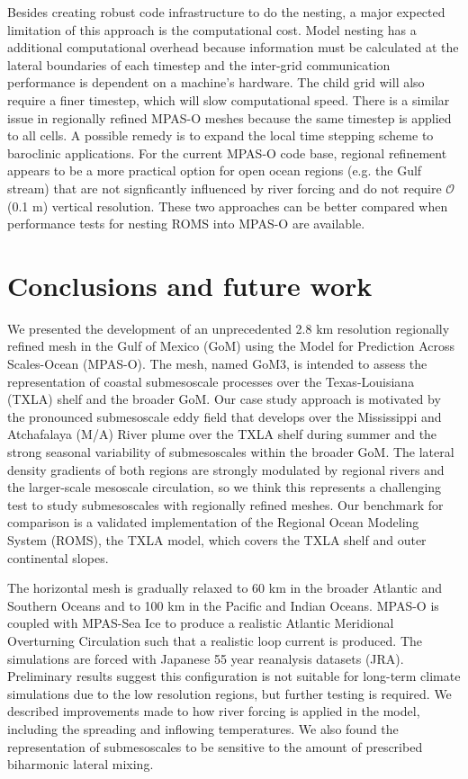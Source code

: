 Besides creating robust code infrastructure to do the nesting, a major expected limitation of this approach is the computational cost. Model nesting has a additional computational overhead because information must be calculated at the lateral boundaries of each timestep and the inter-grid communication performance is dependent on a machine's hardware. The child grid will also require a finer timestep, which will slow computational speed. There is a similar issue in regionally refined MPAS-O meshes because the same timestep is applied to all cells. A possible remedy is to expand the local time stepping scheme \citep{lilly2023storm} to baroclinic applications. For the current MPAS-O code base, regional refinement appears to be a more practical option for open ocean regions (e.g. the Gulf stream) that are not signficantly influenced by river forcing and do not require $\mathcal{O}$(0.1 m) vertical resolution. These two approaches can be better compared when performance tests for nesting ROMS into MPAS-O are available. 

\section{Conclusions and future work}
We presented the development of an unprecedented 2.8 km resolution regionally refined mesh in the Gulf of Mexico (GoM) using the Model for Prediction Across Scales-Ocean (MPAS-O). The mesh, named GoM3, is intended to assess the representation of coastal submesoscale processes over the Texas-Louisiana (TXLA) shelf and the broader GoM. Our case study approach is motivated by the pronounced submesoscale eddy field that develops over the Mississippi and Atchafalaya (M/A) River plume over the TXLA shelf during summer and the strong seasonal variability of submesoscales within the broader GoM. The lateral density gradients of both regions are strongly modulated by regional rivers and the larger-scale mesoscale circulation, so we think this represents a challenging test to study submesoscales with regionally refined meshes. Our benchmark for comparison is a validated implementation of the Regional Ocean Modeling System (ROMS), the TXLA model, which covers the TXLA shelf and outer continental slopes. 

The horizontal mesh is gradually relaxed to 60 km in the broader Atlantic and Southern Oceans and to 100 km in the Pacific and Indian Oceans. MPAS-O is coupled with MPAS-Sea Ice to produce a realistic Atlantic Meridional Overturning Circulation such that a realistic loop current is produced. The simulations are forced with Japanese 55 year reanalysis datasets (JRA). Preliminary results suggest this configuration is not suitable for long-term climate simulations due to the low resolution regions, but further testing is required. We described improvements made to how river forcing is applied in the model, including the spreading and inflowing temperatures. We also found the representation of submesoscales to be sensitive to the amount of prescribed biharmonic lateral mixing. 

